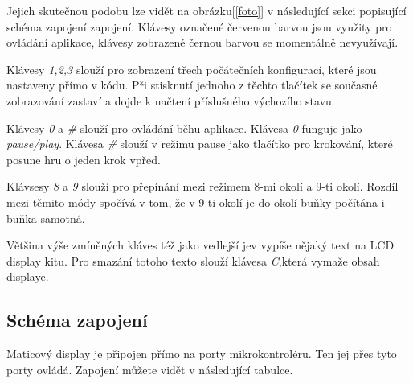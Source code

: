 \documentclass[12pt,a4paper,titlepage]{article}
\begin{document}
Jejich skutečnou podobu lze vidět na obrázku[\ref{foto}] v následující sekci popisující schéma zapojení zapojení. Klávesy označené červenou barvou jsou využity pro ovládání aplikace, klávesy zobrazené černou barvou se momentálně nevyužívají.

Klávesy \textit{1,2,3} slouží pro zobrazení třech počátečních konfigurací, které jsou nastaveny přímo v kódu. Při stisknutí jednoho z těchto tlačítek se současné zobrazování zastaví a dojde k načtení příslušného výchozího stavu.

Klávesy \textit{0} a \textit{\#} slouží pro ovládání běhu aplikace. Klávesa \textit{0} funguje jako \textit{pause/play}. Klávesa \textit{\#} slouží v režimu pause jako tlačítko pro krokování, které posune hru o jeden krok vpřed.

Klávsesy \textit{8} a \textit{9} slouží pro přepínání mezi režimem 8-mi okolí a 9-ti okolí. Rozdíl mezi těmito módy spočívá v tom, že v 9-ti okolí je do okolí buňky počítána i buňka samotná.

Většina výše zmíněných kláves též jako vedlejší jev vypíše nějaký text na LCD display kitu. Pro smazání totoho texto slouží klávesa \textit{C},která vymaže obsah displaye.

\subsection{Schéma zapojení}
Maticový display je připojen přímo na porty mikrokontroléru. Ten jej přes tyto porty ovládá. Zapojení můžete vidět v následující tabulce. 
\end{document}
